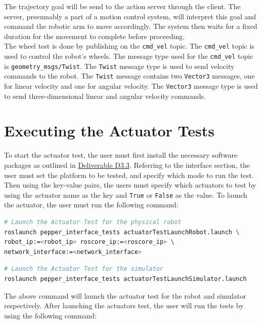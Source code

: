 \documentclass{CSSRforAfrica}
\begin{document}
The trajectory goal will be send to the action server through the client. The server, presumably a part of a 
motion control system, will interpret this goal and command the robotic arm to move accordingly. The system 
then waits for a fixed duration for the movement to complete before proceeding.\\

The wheel test is done by publishing on the \texttt{cmd\_vel} topic. The \texttt{cmd\_vel} topic is used to control the
robot's wheels. The message type used for the \texttt{cmd\_vel} topic is \texttt{geometry\_msgs/Twist}. The \texttt{Twist}
message type is used to send velocity commands to the robot. The \texttt{Twist} message contains two \texttt{Vector3}
messages, one for linear velocity and one for angular velocity. The \texttt{Vector3} message type is used to send
three-dimensional linear and angular velocity commands.

\pagebreak

\section{Executing the Actuator Tests}
To start the actuator test, the user must first install the necessary software packages as outlined in \href{https://cssr4africa.github.io/deliverables/CSSR4Africa_Deliverable_D3.3.pdf}
{Deliverable D3.3}. Referring to the interface section, the user must set the platform to be tested, and specify which mode to run the test. Then using the key-value pairs, the users must
specify which actuators to test by using the actuator name as the key and \texttt{True} or \texttt{False} as the value. To launch the actuator, the user must run the following command:

\begin{lstlisting}[style=withoutNumbering, language=bash]
# Launch the Actuator Test for the physical robot
roslaunch pepper_interface_tests actuatorTestLaunchRobot.launch \
robot_ip:=<robot_ip> roscore_ip:=<roscore_ip> \
network_interface:=<network_interface>
\end{lstlisting}

\begin{lstlisting}[style=withoutNumbering, language=bash]
# Launch the Actuator Test for the simulator
roslaunch pepper_interface_tests actuatorTestLaunchSimulator.launch
\end{lstlisting}

The above command will launch the actuator test for the robot and simulator respectively. After 
launching the actuators test, the user will run the tests by using the following command:
\end{document}
